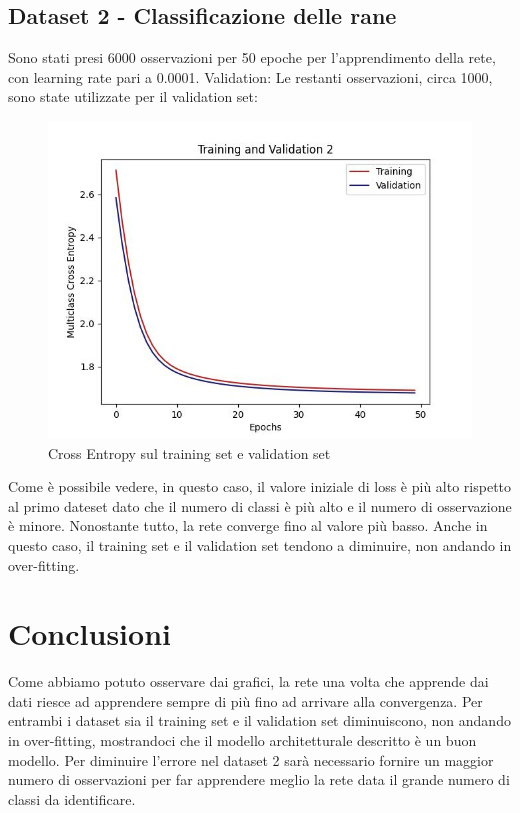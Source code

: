 \documentclass{article}
\begin{document}
        \subsection{Dataset 2 - Classificazione delle rane}\label{subsec:dataset-2---classificazione-delle-rane}
            Sono stati presi 6000 osservazioni per 50 epoche per l'apprendimento della rete, con learning rate pari a 0.0001.
            Validation: Le restanti osservazioni, circa 1000, sono state utilizzate per il validation set:
            \begin{figure}[H]
                \centering
                \includegraphics[scale=0.50]{lossval2}
                \caption{Cross Entropy sul training set e validation set}
                \label{fig:figure4}
            \end{figure}
            \newpage
            Come è possibile vedere, in questo caso, il valore iniziale di loss è più alto rispetto al primo dateset dato che il numero di classi è più alto e il numero di osservazione è minore.
            Nonostante tutto, la rete converge fino al valore più basso.
            Anche in questo caso, il training set e il validation set tendono a diminuire, non andando in over-fitting.
    \section{Conclusioni}\label{sec:conclusioni}
        Come abbiamo potuto osservare dai grafici, la rete una volta che apprende dai dati riesce ad apprendere sempre di più fino ad arrivare alla convergenza.
        Per entrambi i dataset sia il training set e il validation set diminuiscono, non andando in over-fitting, mostrandoci che il modello architetturale descritto è un buon modello.
        Per diminuire l'errore nel dataset 2 sarà necessario fornire un maggior numero di osservazioni per far apprendere meglio la rete data il grande numero di classi da identificare.
\end{document}
